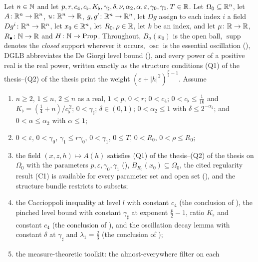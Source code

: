 \begin{helper}
Let $n\in\mathbb{N}$ and let
$p,r,c_4,c_\flat,K_\flat,\gamma_\sharp,\delta,\nu,\alpha_2,\alpha,\varepsilon,\gamma_0,\gamma_1,T\in\mathbb{R}$.
Let $\Omega_0\subseteq\mathbb{R}^n$, let $A\colon\mathbb{R}^n\to\mathbb{R}^n$, $u\colon\mathbb{R}^n\to\mathbb{R}$,
$g,g'\colon\mathbb{R}^n\to\mathbb{R}^n$, let $Dg$ assign to each index $i$ a field
$Dg^i\colon\mathbb{R}^n\to\mathbb{R}^n$, let $x_0\in\mathbb{R}^n$, let $R_0,\rho\in\mathbb{R}$, let $k$ be an
index, and let $\mu\colon\mathbb{R}\to\mathbb{R}$, $R_\bullet\colon\mathbb{N}\to\mathbb{R}$ and
$H\colon\mathbb{N}\to\mathrm{Prop}$.  Throughout, $B_\sigma(x_0)$ is the open ball,
$\operatorname{supp}$ denotes the \emph{closed} support wherever it occurs,
$\operatorname*{osc}$ is the essential oscillation
(), $\mathrm{DGLB}$ abbreviates the De Giorgi level bound
(), and every power of a positive real is the real
power, written exactly as the structure conditions
(Q1) of the thesis--(Q2) of the thesis print the weight
$(\varepsilon+|h|^2)^{\frac p2-1}$.  Assume
\begin{enumerate}
\item[(H1)] $n\ge2$, $1\le n$, $2\le n$ as a real, $1<p$, $0<r$;
  $0<c_4$; $0<c_\flat\le\tfrac1{16}$ and
  $K_\flat=(\tfrac14+n)/c_\flat^{\,2}$; $0<\gamma_\sharp$;
  $\delta\in(0,1)$; $0<\alpha_2\le1$ with $\delta\le2^{-\alpha_2}$; and
  $0<\alpha\le\alpha_2$ with $\alpha\le1$;
\item[(H2)] $0<\varepsilon$, $0<\gamma_0$, $\gamma_1\le r\gamma_0$,
  $0<\gamma_1$, $0\le T$, $0<R_0$, $0<\rho\le R_0$;
\item[(H3)] the field $(x,z,h)\mapsto A(h)$ satisfies
  (Q1) of the thesis--(Q2) of the thesis on $\Omega_0$ with the parameters
  $p,\varepsilon,\gamma_0,\gamma_1$ (),
  $B_{R_0}(x_0)\subseteq\Omega_0$, the cited regularity result (C1) is
  available for every parameter set and open set
  (), and the structure bundle restricts to
  subsets;
\item[(H4)] the Caccioppoli inequality at level $l$ with constant $c_4$
  (the conclusion of ), the pinched level
  bound with constant $\gamma_\sharp$ at exponent $\tfrac p2-1$, ratio
  $K_\flat$ and constant $c_4$ (the conclusion of
  ), and the oscillation decay lemma with
  constant $\delta$ at $\gamma_\sharp$ and $\lambda_1=\tfrac23$ (the conclusion
  of );
\item[(H5)] the measure-theoretic toolkit: the almost-everywhere filter on each

\end{enumerate}
\end{helper}
